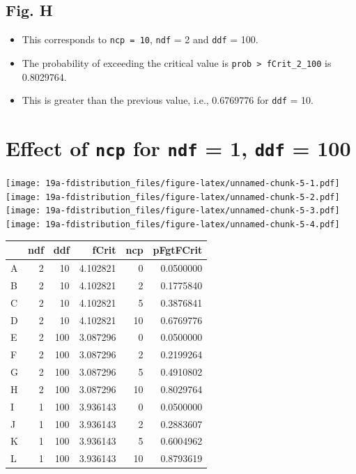 \documentclass[
]{book}
\providecommand{\tightlist}{%
  \setlength{\itemsep}{0pt}\setlength{\parskip}{0pt}}
\begin{document}
\hypertarget{fig.-h}{%
\subsection{Fig. H}\label{fig.-h}}

\begin{itemize}
\tightlist
\item
  This corresponds to \texttt{ncp\ =\ 10}, \texttt{ndf} = 2 and \texttt{ddf} = 100.
\item
  The probability of exceeding the critical value is \texttt{prob\ \textgreater{}\ fCrit\_2\_100} is 0.8029764.
\item
  This is greater than the previous value, i.e., 0.6769776 for \texttt{ddf} = 10.
\end{itemize}

\hypertarget{effect-of-ncp-for-ndf-1-ddf-100}{%
\section{\texorpdfstring{Effect of \texttt{ncp} for \texttt{ndf} = 1, \texttt{ddf} = 100}{Effect of ncp for ndf = 1, ddf = 100}}\label{effect-of-ncp-for-ndf-1-ddf-100}}

\texttt{[image: 19a-fdistribution\_files/figure-latex/unnamed-chunk-5-1.pdf]} \texttt{[image: 19a-fdistribution\_files/figure-latex/unnamed-chunk-5-2.pdf]} \texttt{[image: 19a-fdistribution\_files/figure-latex/unnamed-chunk-5-3.pdf]} \texttt{[image: 19a-fdistribution\_files/figure-latex/unnamed-chunk-5-4.pdf]}

\begin{tabular}{l|r|r|r|r|r}
\hline
  & ndf & ddf & fCrit & ncp & pFgtFCrit\\
\hline
A & 2 & 10 & 4.102821 & 0 & 0.0500000\\
\hline
B & 2 & 10 & 4.102821 & 2 & 0.1775840\\
\hline
C & 2 & 10 & 4.102821 & 5 & 0.3876841\\
\hline
D & 2 & 10 & 4.102821 & 10 & 0.6769776\\
\hline
E & 2 & 100 & 3.087296 & 0 & 0.0500000\\
\hline
F & 2 & 100 & 3.087296 & 2 & 0.2199264\\
\hline
G & 2 & 100 & 3.087296 & 5 & 0.4910802\\
\hline
H & 2 & 100 & 3.087296 & 10 & 0.8029764\\
\hline
I & 1 & 100 & 3.936143 & 0 & 0.0500000\\
\hline
J & 1 & 100 & 3.936143 & 2 & 0.2883607\\
\hline
K & 1 & 100 & 3.936143 & 5 & 0.6004962\\
\hline
L & 1 & 100 & 3.936143 & 10 & 0.8793619\\
\hline
\end{tabular}
\end{document}
